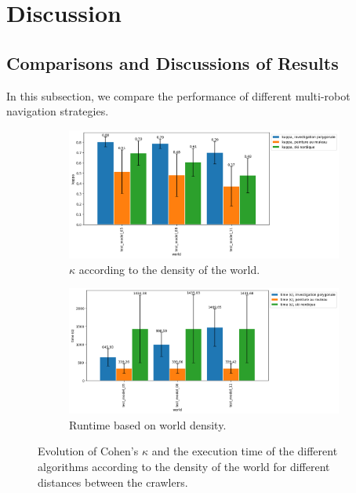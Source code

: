 
\chapter{Discussion}

\section*{Comparisons and Discussions of Results}

In this subsection, we compare the performance of different multi-robot navigation strategies.

\begin{figure}[h!]
	\begin{subfigure}[t]{0.9\linewidth}
		\includegraphics[width=\linewidth]{graphics/investigation_polygonale-peinture_au_rouleau_ski_nordique-kappa_for_each_world_vs_investigation_polygonale-kappa_for_each_world.png}
		\caption{$\kappa$ according to the density of the world.}
		\label{fig:investigation_polygonale-peinture_au_rouleau_ski_nordique-kappa_for_each_world_vs_investigation_polygonale-kappa_for_each_d}
	\end{subfigure}
	\hfill
	\begin{subfigure}[t]{0.9\linewidth}
		\includegraphics[width=\linewidth]{graphics/investigation_polygonale-peinture_au_rouleau_ski_nordique-time_for_each_world_vs_investigation_polygonale-time_for_each_world.png}
		\caption{Runtime based on world density.}
		\label{fig:investigation_polygonale-peinture_au_rouleau_ski_nordique-time_for_each_world_vs_investigation_polygonale-time_for_each_d}
	\end{subfigure}
	\caption{Evolution of Cohen's $\kappa$ and the execution time of the different algorithms according to the density of the world for different distances between the crawlers.}
	\label{fig:investigation_polygonale-peinture_au_rouleau_ski_nordique_for_each_world}
\end{figure}

